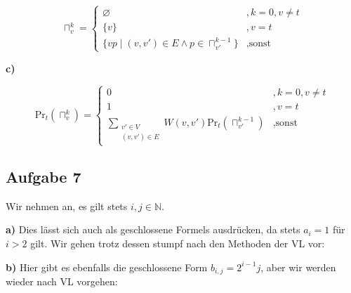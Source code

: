 \documentclass[a4paper,graphics,11pt]{article}
\newcommand{\aufgabe}[1]{\subsection*{Aufgabe #1}}
\begin{document}
$$
    \sqcap_v^k = \begin{cases}
        \varnothing & ,k = 0, v \neq t\\
        \{v\} & ,v = t\\
        \{vp \mid (v,v') \in E \land p \in \sqcap_{v'}^{k-1}\} & ,\text{sonst}
    \end{cases}
$$

\textbf{c)}

$$
    \text{Pr}_{t}(\sqcap_v^k) = \begin{cases}
        0 & ,k = 0, v \neq t\\
        1 & ,v = t\\
        \displaystyle\sum_{\substack{v' \in V\\ (v,v') \in E}} W(v,v')\text{Pr}_t(\sqcap_{v'}^{k-1}) & ,\text{sonst}
    \end{cases}
$$

\aufgabe{7}
Wir nehmen an, es gilt stets $i,j \in \mathbb{N}$.

\textbf{a)}
Dies lässt sich auch als geschlossene Formels ausdrücken, da stets $a_i = 1$ für $i > 2$ gilt.
Wir gehen trotz dessen stumpf nach den Methoden der VL vor:



\newpage

\textbf{b)}
Hier gibt es ebenfalls die geschlossene Form $b_{i,j} = 2^{i-1}j$, aber wir werden wieder nach VL vorgehen:


\end{document}
